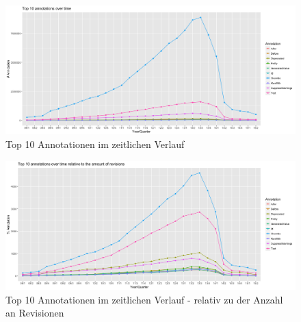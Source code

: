 \documentclass[11pt,a4paper,parskip=full]{scrartcl}
\begin{document}
\begin{figure}[H]
	\centering
	\includegraphics[width=\textwidth]{plots/absolute_top10_over_time.png}
	\caption{Top 10 Annotationen im zeitlichen Verlauf}
	\label{top10_over_time}
\end{figure}
\begin{figure}[H]
	\centering
	\includegraphics[width=\textwidth]{plots/top10_relative.png}
	\caption{Top 10 Annotationen im zeitlichen Verlauf - relativ zu der Anzahl an Revisionen}
	\label{top10_over_time_relative}
\end{figure}
\end{document}
